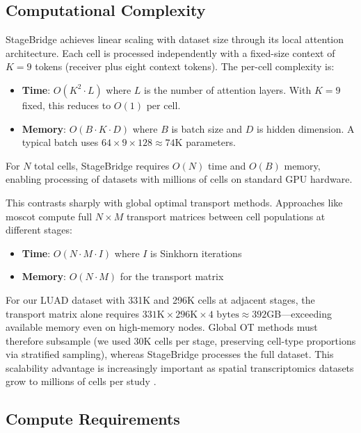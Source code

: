 \documentclass[conference]{IEEEtran}
\begin{document}
\subsection{Computational Complexity}

StageBridge achieves linear scaling with dataset size through its local attention architecture. Each cell is processed independently with a fixed-size context of $K=9$ tokens (receiver plus eight context tokens). The per-cell complexity is:
\begin{itemize}
    \item \textbf{Time}: $O(K^2 \cdot L)$ where $L$ is the number of attention layers. With $K=9$ fixed, this reduces to $O(1)$ per cell.
    \item \textbf{Memory}: $O(B \cdot K \cdot D)$ where $B$ is batch size and $D$ is hidden dimension. A typical batch uses $64 \times 9 \times 128 \approx 74$K parameters.
\end{itemize}

For $N$ total cells, StageBridge requires $O(N)$ time and $O(B)$ memory, enabling processing of datasets with millions of cells on standard GPU hardware.

This contrasts sharply with global optimal transport methods. Approaches like moscot \cite{Klein2025-jg} compute full $N \times M$ transport matrices between cell populations at different stages:
\begin{itemize}
    \item \textbf{Time}: $O(N \cdot M \cdot I)$ where $I$ is Sinkhorn iterations
    \item \textbf{Memory}: $O(N \cdot M)$ for the transport matrix
\end{itemize}

For our LUAD dataset with 331K and 296K cells at adjacent stages, the transport matrix alone requires $331\text{K} \times 296\text{K} \times 4\text{ bytes} \approx 392$GB---exceeding available memory even on high-memory nodes. Global OT methods must therefore subsample (we used 30K cells per stage, preserving cell-type proportions via stratified sampling), whereas StageBridge processes the full dataset. This scalability advantage is increasingly important as spatial transcriptomics datasets grow to millions of cells per study \cite{Tejada-Lapuerta2025-wz}.

\subsection{Compute Requirements}
\end{document}
